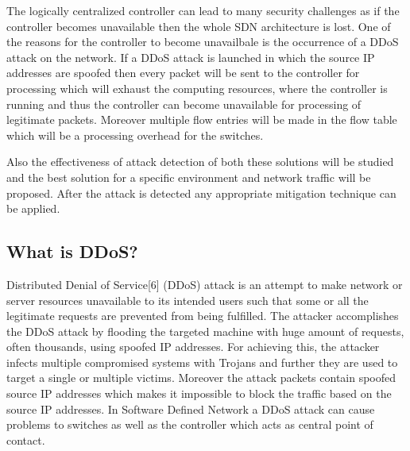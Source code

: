 \documentclass[12pt,a4paper,final]{report}
\begin{document}
The logically centralized controller can lead to many security challenges as if the controller becomes unavailable then the whole SDN architecture is lost. One of the reasons for the controller to become unavailbale is the occurrence of a DDoS attack on the network. If a DDoS attack is launched in which the source IP addresses are spoofed then every packet will be sent to the controller for processing which will exhaust the computing resources, where the controller is running and thus the controller can become unavailable for processing of legitimate packets. Moreover multiple flow entries will be made in the flow table which will be a processing overhead for the switches.

Also the effectiveness of attack detection of both these solutions will be studied and the best solution for a specific environment and network traffic will be proposed. After the attack is detected any appropriate mitigation technique can be applied.

\subsection{What is DDoS?}
Distributed Denial of Service[6] (DDoS) attack is an attempt to make network or server resources
unavailable to its intended users such that some or all the legitimate requests are prevented from being fulfilled. The attacker accomplishes the DDoS attack by flooding the targeted machine with huge amount of requests, often thousands, using spoofed IP addresses. For achieving this, the attacker infects multiple compromised systems with Trojans and further they are used to target a single or multiple victims. Moreover the attack packets contain spoofed source IP addresses which makes it impossible to block the traffic based on the source IP addresses. In Software Defined Network a DDoS attack can cause problems to switches as well as the controller which acts as central point of contact.
\end{document}
